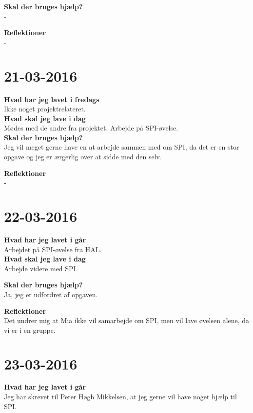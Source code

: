 \documentclass{article}
\begin{document}
	\textbf{Skal der bruges hjælp?}\\
	-
	
	\textbf{Reflektioner}\\
	-
	
	\section{21-03-2016}
	
	\textbf{Hvad har jeg lavet i fredags}\\
	Ikke noget projektrelateret.\\
	
	\textbf{Hvad skal jeg lave i dag}\\
	Mødes med de andre fra projektet. Arbejde på SPI-øvelse.\\    
	
	\textbf{Skal der bruges hjælp?}\\
	Jeg vil meget gerne have en at arbejde sammen med om SPI, da det er en stor opgave og jeg er ærgerlig over at sidde med den selv.
	
	\textbf{Reflektioner}\\
	-
	
	
	\section{22-03-2016}
	
	\textbf{Hvad har jeg lavet i går}\\
	Arbejdet på SPI-øvelse fra HAL.\\
	
	\textbf{Hvad skal jeg lave i dag}\\
	Arbejde videre med SPI.    
	
	\textbf{Skal der bruges hjælp?}\\
	Ja, jeg er udfordret af opgaven.
	
	\textbf{Reflektioner}\\
	Det undrer mig at Mia ikke vil samarbejde om SPI, men vil lave øvelsen alene, da vi er i en gruppe. 
	
	
	\section{23-03-2016}
	
	\textbf{Hvad har jeg lavet i går}\\
	Jeg har skrevet til Peter Høgh Mikkelsen, at jeg gerne vil have noget hjælp til SPI. \\
	
\end{document}
